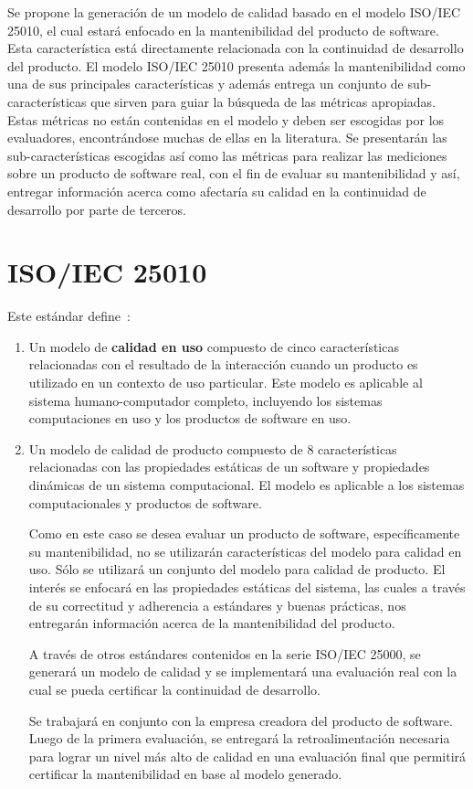 Se propone la generación de un modelo de calidad basado en el 
modelo ISO/IEC 25010, el cual estará enfocado en la mantenibilidad del producto 
de software. Esta característica está directamente relacionada con la 
continuidad de desarrollo del producto.
El modelo ISO/IEC 25010 presenta además la mantenibilidad como una de sus principales
características y además entrega un conjunto de sub-características que sirven para
guiar la búsqueda de las métricas apropiadas.
Estas métricas no están contenidas en el modelo y deben ser escogidas por los evaluadores, 
encontrándose muchas de ellas en la literatura.
Se presentarán las sub-características escogidas así como las 
métricas para realizar las mediciones sobre un producto de software real, 
con el fin de evaluar su mantenibilidad y así, entregar información acerca como afectaría
su calidad en la continuidad de desarrollo por parte de terceros.

\section{ISO/IEC 25010}

Este estándar define~\cite{25010}:

\begin{enumerate}
\item Un modelo de \textbf{calidad en uso} compuesto de cinco características
relacionadas con el resultado de la interacción cuando un producto es utilizado
en un contexto de uso particular. Este modelo es aplicable al sistema
humano-computador completo, incluyendo los sistemas computaciones en uso
y los productos de software en uso.

\item Un modelo de calidad de producto compuesto de 8 características relacionadas
con las propiedades estáticas de un software y propiedades dinámicas de un sistema
computacional. El modelo es aplicable a los sistemas computacionales y productos
de software.

Como en este caso se desea evaluar un producto de software, específicamente
su mantenibilidad, no se utilizarán características del modelo para calidad
en uso. Sólo se utilizará un conjunto del modelo para calidad de producto.
El interés se enfocará en las propiedades estáticas del sistema, las cuales
a través de su correctitud y adherencia a estándares y buenas prácticas, nos
entregarán información acerca de la mantenibilidad del producto.

A través de otros estándares contenidos en la serie ISO/IEC 25000, se generará
un modelo de calidad y se implementará una evaluación real con la cual se 
pueda certificar la continuidad de desarrollo.

Se trabajará en conjunto con la empresa creadora del producto de software.
Luego de la primera evaluación, se entregará la retroalimentación necesaria
para lograr un nivel más alto de calidad en una evaluación final que permitirá
certificar la mantenibilidad en base al modelo generado.
\end{enumerate}


